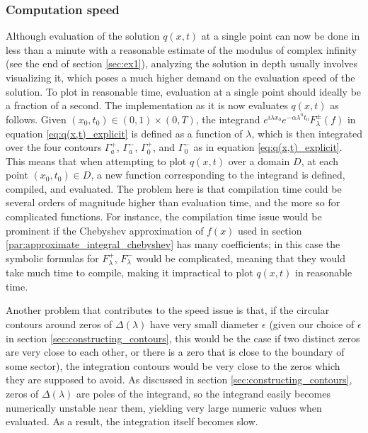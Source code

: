 \documentclass[12pt, oneside, a4paper]{article}
\begin{document}
\subsubsection{Computation speed}

Although evaluation of the solution $q(x,t)$ at a single point can now be done in less than a minute with a reasonable estimate of the modulus of complex infinity (see the end of section \ref{sec:ex1}), analyzing the solution in depth usually involves visualizing it, which poses a much higher demand on the evaluation speed of the solution. To plot in reasonable time, evaluation at a single point should ideally be a fraction of a second. The implementation as it is now evaluates $q(x,t)$ as follows. Given $(x_0, t_0)\in (0,1)\times (0,T)$, the integrand $e^{i\lambda x_0}e^{-\alpha \lambda^n t_0}F_\lambda^\pm(f)$ in equation \eqref{eq:q(x,t)_explicit} is defined as a function of $\lambda$, which is then integrated over the four contours $\Gamma_a^+$, $\Gamma_a^-$, $\Gamma_0^+$, and $\Gamma_0^-$ as in equation \eqref{eq:q(x,t)_explicit}. This means that when attempting to plot $q(x,t)$ over a domain $D$, at each point $(x_0, t_0)\in D$, a new function corresponding to the integrand is defined, compiled, and evaluated. The problem here is that compilation time could be several orders of magnitude higher than evaluation time, and the more so for complicated functions. For instance, the compilation time issue would be prominent if the Chebyshev approximation of $f(x)$ used in section \ref{par:approximate_integral_chebyshev} has many coefficients; in this case the symbolic formulas for $F_\lambda^+$, $F_\lambda^-$ would be complicated, meaning that they would take much time to compile, making it impractical to plot $q(x,t)$ in reasonable time.

Another problem that contributes to the speed issue is that, if the circular contours around zeros of $\Delta(\lambda)$ have very small diameter $\epsilon$ (given our choice of $\epsilon$ in section \ref{sec:constructing_contours}, this would be the case if two distinct zeros are very close to each other, or there is a zero that is close to the boundary of some sector), the integration contours would be very close to the zeros which they are supposed to avoid. As discussed in section \ref{sec:constructing_contours}, zeros of $\Delta(\lambda)$ are poles of the integrand, so the integrand easily becomes numerically unstable near them, yielding very large numeric values when evaluated. As a result, the integration itself becomes slow.
\end{document}
